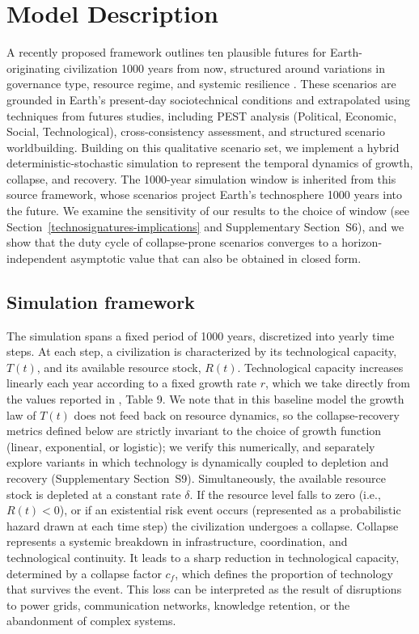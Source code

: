 \section{Model Description}\label{model-description}

A recently proposed framework outlines ten plausible futures for Earth-originating civilization 1000 years from now, structured around variations in governance type, resource regime, and systemic resilience \citep{Haqq-Misra2025-rt}. These scenarios are grounded in Earth's present-day sociotechnical conditions and extrapolated using techniques from futures studies, including PEST analysis (Political, Economic, Social, Technological), cross-consistency assessment, and structured scenario worldbuilding. Building on this qualitative scenario set, we implement a hybrid deterministic-stochastic simulation to represent the temporal dynamics of growth, collapse, and recovery. The 1000-year simulation window is inherited from this source framework, whose scenarios project Earth's technosphere 1000 years into the future. We examine the sensitivity of our results to the choice of window (see Section~\ref{technosignatures-implications} and Supplementary Section~S6), and we show that the duty cycle of collapse-prone scenarios converges to a horizon-independent asymptotic value that can also be obtained in closed form.

\subsection{Simulation framework}\label{simulation-framework}

The simulation spans a fixed period of 1000 years, discretized into yearly time steps. At each step, a civilization is characterized by its technological capacity, \(T(t)\), and its available resource stock, \(R(t)\). Technological capacity increases linearly each year according to a fixed growth rate \(r\), which we take directly from the values reported in \citet{Haqq-Misra2025-rt}, Table 9. We note that in this baseline model the growth law of $T(t)$ does not feed back on resource dynamics, so the collapse-recovery metrics defined below are strictly invariant to the choice of growth function (linear, exponential, or logistic); we verify this numerically, and separately explore variants in which technology is dynamically coupled to depletion and recovery (Supplementary Section~S9). Simultaneously, the available resource stock is depleted at a constant rate \(\delta\). If the resource level falls to zero (i.e., \(R(t) < 0\)), or if an existential risk event occurs (represented as a probabilistic hazard drawn at each time step) the civilization undergoes a collapse. Collapse represents a systemic breakdown in infrastructure, coordination, and technological continuity. It leads to a sharp reduction in technological capacity, determined by a collapse factor \(c_{f}\), which defines the proportion of technology that survives the event. This loss can be interpreted as the result of disruptions to power grids, communication networks, knowledge retention, or the abandonment of complex systems.

